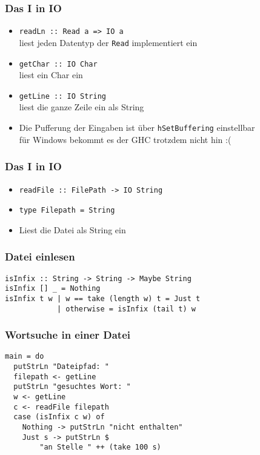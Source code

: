 \begin{frame}
\frametitle{Das I in IO}
\begin{block}{\vspace*{-3ex}}
\begin{itemize}
  \item \lstinline|readLn :: Read a => IO a|\\ liest jeden Datentyp der \lstinline|Read| implementiert ein
  \item \lstinline|getChar :: IO Char|\\ liest ein Char ein
  \item \lstinline|getLine :: IO String|\\ liest die ganze Zeile ein als String
  \item Die Pufferung der Eingaben ist über \lstinline|hSetBuffering| einstellbar\\ für Windows bekommt es der GHC trotzdem nicht hin :(
\end{itemize}
\end{block}
\end{frame}

\begin{frame}
\frametitle{Das I in IO}
\begin{block}{\vspace*{-3ex}}
\begin{itemize}
  \item \lstinline|readFile :: FilePath -> IO String|
  \item \lstinline|type Filepath = String|
  \item Liest die Datei als String ein
\end{itemize}
\end{block}
\end{frame}

\begin{frame}[fragile]
\frametitle{Datei einlesen}
\begin{lstlisting}
isInfix :: String -> String -> Maybe String
isInfix [] _ = Nothing
isInfix t w | w == take (length w) t = Just t
            | otherwise = isInfix (tail t) w
\end{lstlisting}	
\end{frame}

\begin{frame}[fragile]
\frametitle{Wortsuche in einer Datei}
\begin{lstlisting}
main = do
  putStrLn "Dateipfad: "
  filepath <- getLine
  putStrLn "gesuchtes Wort: "
  w <- getLine
  c <- readFile filepath
  case (isInfix c w) of
    Nothing -> putStrLn "nicht enthalten"
    Just s -> putStrLn $
        "an Stelle " ++ (take 100 s)
\end{lstlisting}	
\end{frame}

